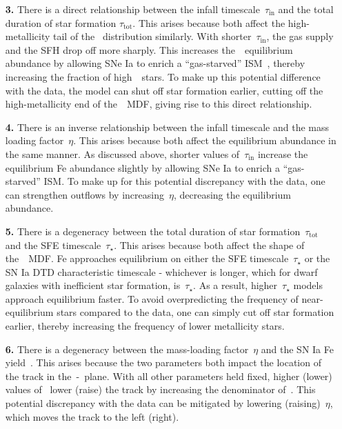 \documentclass[ms.tex]{subfiles}
\begin{document}
\begin{itemize}
\begin{itemize}
		\item[\textbf{3.}] There is a direct relationship between the infall
		timescale~$\tau_\text{in}$ and the total duration of star formation
		$\tau_\text{tot}$.
		This arises because both affect the high-metallicity tail of the~\feh
		distribution similarly.
		With shorter~$\tau_\text{in}$, the gas supply and the SFH drop off more
		sharply.
		This increases the~\feh~equilibrium abundance by allowing SNe Ia to
		enrich a ``gas-starved'' ISM~\citep[see discussion in][]{Weinberg2017},
		thereby increasing the fraction of high~\feh~stars.
		To make up this potential difference with the data, the model can shut
		off star formation earlier, cutting off the high-metallicity end of
		the~\feh~MDF, giving rise to this direct relationship.

		\item[\textbf{4.}] There is an inverse relationship between the infall
		timescale and the mass loading factor~$\eta$.
		This arises because both affect the equilibrium abundance in the same
		manner.
		As discussed above, shorter values of~$\tau_\text{in}$ increase the
		equilibrium Fe abundance slightly by allowing SNe Ia to enrich a
		``gas-starved'' ISM.
		To make up for this potential discrepancy with the data, one can
		strengthen outflows by increasing~$\eta$, decreasing the equilibrium
		abundance.

		\item[\textbf{5.}] There is a degeneracy between the total duration of
		star formation~$\tau_\text{tot}$ and the SFE timescale~$\tau_\star$.
		This arises because both affect the shape of the~\feh~MDF.
		Fe approaches equilibrium on either the SFE timescale~$\tau_\star$ or
		the SN Ia DTD characteristic timescale - whichever is longer, which for
		dwarf galaxies with inefficient star formation, is~$\tau_\star$.
		As a result, higher~$\tau_\star$ models approach equilibrium faster.
		To avoid overpredicting the frequency of near-equilibrium stars
		compared to the data, one can simply cut off star formation earlier,
		thereby increasing the frequency of lower metallicity stars.

		\item[\textbf{6.}] There is a degeneracy between the mass-loading
		factor~$\eta$ and the SN Ia Fe yield~\yfeia.
		This arises because the two parameters both impact the location of the
		track in the~\afe-\feh~plane.
		With all other parameters held fixed, higher (lower) values of~\yfeia
		lower (raise) the track by increasing the denominator of~\afe.
		This potential discrepancy with the data can be mitigated by lowering
		(raising)~$\eta$, which moves the track to the left (right).


\end{itemize}
\end{itemize}
\end{document}

